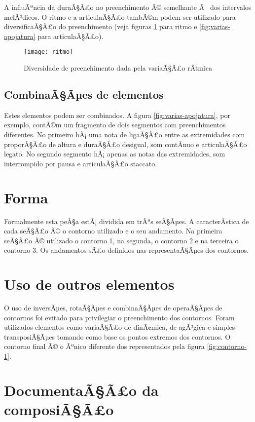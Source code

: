 \documentclass[12pt]{article}
\begin{document}
A influÃªncia da duraÃ§Ã£o no preenchimento Ã© semelhante Ã  dos intervalos
melÃ³dicos. O ritmo e a articulaÃ§Ã£o tambÃ©m podem ser utilizado para
diversificaÃ§Ã£o do preenchimento (veja figuras \ref{fig:ritmo} para
ritmo e \ref{fig:varias-apojatura} para articulaÃ§Ã£o).

\begin{figure}[h]
  \centering
  \texttt{[image: ritmo]}
  \caption{Diversidade de preenchimento dada pela variaÃ§Ã£o rÃ­tmica}
  \label{fig:ritmo}
\end{figure}

\subsection{CombinaÃ§Ãµes de elementos}
\label{sec:comb-de-elem}

Estes elementos podem ser combinados. A figura
\ref{fig:varias-apojatura}, por exemplo, contÃ©m um fragmento de dois
segmentos com preenchimentos diferentes. No primeiro hÃ¡ uma nota de
ligaÃ§Ã£o entre as extremidades com proporÃ§Ã£o de altura e duraÃ§Ã£o
desigual, som contÃ­nuo e articulaÃ§Ã£o legato. No segundo segmento hÃ¡
apenas as notas das extremidades, som interrompido por pausa e
articulaÃ§Ã£o staccato.

\section{Forma}
\label{sec:forma}

Formalmente esta peÃ§a estÃ¡ dividida em trÃªs seÃ§Ãµes. A caracterÃ­stica
de cada seÃ§Ã£o Ã© o contorno utilizado e o seu andamento. Na primeira
seÃ§Ã£o Ã© utilizado o contorno 1, na segunda, o contorno 2 e na terceira
o contorno 3. Os andamentos sÃ£o definidos nas representaÃ§Ãµes dos
contornos.

\section{Uso de outros elementos}
\label{sec:uso-de-outros}

O uso de inversÃµes, rotaÃ§Ãµes e combinaÃ§Ãµes de operaÃ§Ãµes de contornos
foi evitado para privilegiar o preenchimento dos contornos. Foram
utilizados elementos como variaÃ§Ã£o de dinÃ¢mica, de agÃ³gica e simples
transposiÃ§Ãµes tomando como base os pontos extremos dos contornos. O
contorno final Ã© o Ãºnico diferente dos representados pela figura
\ref{fig:contorno-1}.

\section{DocumentaÃ§Ã£o da composiÃ§Ã£o}
\label{sec:docum-da-comp}
\end{document}
